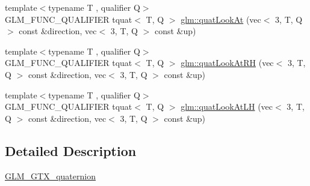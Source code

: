 \begin{DoxyCompactItemize}
\item 
{\footnotesize template$<$typename T , qualifier Q$>$ }\\G\+L\+M\+\_\+\+F\+U\+N\+C\+\_\+\+Q\+U\+A\+L\+I\+F\+I\+ER tquat$<$ T, Q $>$ \hyperlink{group__gtx__quaternion_ga668d9ec9964ced2b455d416677e1e8b9}{glm\+::quat\+Look\+At} (vec$<$ 3, T, Q $>$ const \&direction, vec$<$ 3, T, Q $>$ const \&up)
\item 
{\footnotesize template$<$typename T , qualifier Q$>$ }\\G\+L\+M\+\_\+\+F\+U\+N\+C\+\_\+\+Q\+U\+A\+L\+I\+F\+I\+ER tquat$<$ T, Q $>$ \hyperlink{group__gtx__quaternion_gad30cbeb78315773b6d18d9d1c1c75b77}{glm\+::quat\+Look\+At\+RH} (vec$<$ 3, T, Q $>$ const \&direction, vec$<$ 3, T, Q $>$ const \&up)
\item 
{\footnotesize template$<$typename T , qualifier Q$>$ }\\G\+L\+M\+\_\+\+F\+U\+N\+C\+\_\+\+Q\+U\+A\+L\+I\+F\+I\+ER tquat$<$ T, Q $>$ \hyperlink{group__gtx__quaternion_ga6f1b3fba52fcab952d0ab523177ff443}{glm\+::quat\+Look\+At\+LH} (vec$<$ 3, T, Q $>$ const \&direction, vec$<$ 3, T, Q $>$ const \&up)
\end{DoxyCompactItemize}


\subsection{Detailed Description}
\hyperlink{group__gtx__quaternion}{G\+L\+M\+\_\+\+G\+T\+X\+\_\+quaternion} 